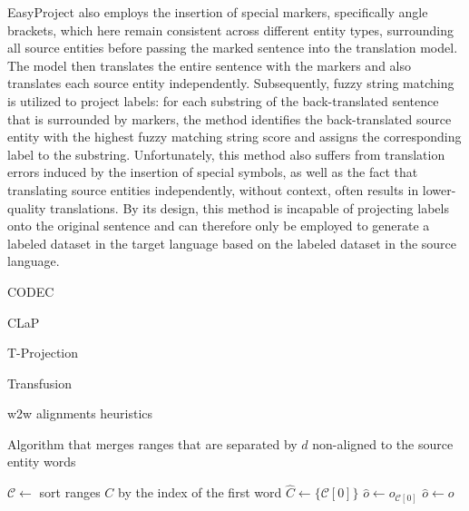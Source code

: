 EasyProject \cite{chen-etal-2023-frustratingly} also employs the insertion of special markers,
specifically angle brackets, which here remain consistent across different entity types, surrounding all
source entities before passing the marked sentence into the translation
model. The model then translates the entire sentence with the markers and also translates each source
entity independently. Subsequently, fuzzy string matching is utilized to project labels: for each substring
of the back-translated sentence that is surrounded by markers, the method identifies the back-translated
source entity with the highest fuzzy matching string score and assigns the corresponding label to the substring.
Unfortunately, this method also suffers from translation errors induced by the insertion of special
symbols, as well as the fact that translating source entities independently, without context, often
results in lower-quality translations. By its design, this method is incapable of projecting labels
onto the original sentence and can therefore only be employed to generate a labeled dataset in the target language
based on the labeled dataset in the source language.

CODEC \cite{Le2024ConstrainedDF}

CLaP \cite{parekh-etal-2024-contextual}

T-Projection \cite{garcia-ferrero-etal-2023-projection}

Transfusion \cite{transfusion}

w2w alignments heuristics \cite{garcia-ferrero-etal-2022-model}

\begin{algorithm}
  \caption{Algorithm that merges ranges that are separated by \( d \) non-aligned to the source entity words}
  \label{alg:merge}


  \( \mathcal{C} \gets \) sort ranges \(C\) by the index of the first word \;
  \( \hat{C} \gets \{ \mathcal{C}[0] \} \)  \;
  \( \hat{o} \gets o_{\mathcal{C}[0]} \) \;
  {
    \( \hat{o} \gets o \) \;
  }
\end{algorithm}

